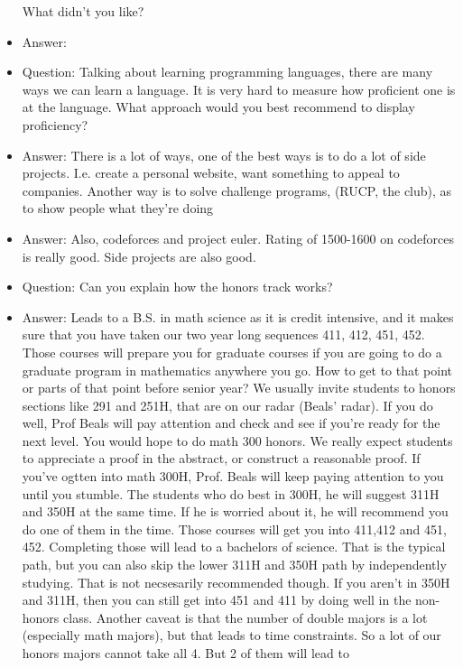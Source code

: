 \documentclass[10pt]{article}
\theoremstyle{definition}
\begin{document}
\begin{itemize}
    What didn't you like?
  \item Answer:
  \item Question: Talking about learning programming languages,
    there are many ways we can learn a language. It is very hard
    to measure how proficient one is at the language. What
    approach would you best recommend to display proficiency?
  \item Answer: There is a lot of ways, one of the best ways is
    to do a lot of side projects. I.e. create a personal website,
    want something to appeal to companies. Another way is to solve
    challenge programs, (RUCP, the club), as to show people what
    they're doing
  \item Answer: Also, codeforces and project euler. Rating of
    1500-1600 on codeforces is really good. Side projects are also
    good.
  \item Question: Can you explain how the honors track works?
  \item Answer: Leads to a B.S. in math science as it is credit
    intensive, and it makes sure that you have taken our two year
    long sequences 411, 412, 451, 452. Those courses will prepare
    you for graduate courses if you are going to do a graduate
    program in mathematics anywhere you go. How to get to that
    point or parts of that point before senior year? We usually
    invite students to honors sections like 291 and 251H, that are
    on our radar (Beals' radar). If you do well, Prof Beals will
    pay attention and check and see if you're ready for the next
    level. You would hope to do math 300 honors. We really expect
    students to appreciate a proof in the abstract, or construct a
    reasonable proof. If you've ogtten into math 300H, Prof. Beals
    will keep paying attention to you until you stumble. The
    students who do best in 300H, he will suggest 311H and 350H at
    the same time. If he is worried about it, he will recommend
    you do one of them in the time. Those courses will get you
    into 411,412 and 451, 452. Completing those will lead to a
    bachelors of science. That is the typical path, but you can
    also skip the lower 311H and 350H path by independently
    studying. That is not necsesarily recommended though. If you
    aren't in 350H and 311H, then you can still get into 451 and
    411 by doing well in the non-honors class. Another caveat is
    that the number of double majors is a lot (especially math
    majors), but that leads to time constraints. So a lot of our
    honors majors cannot take all 4. But 2 of them will lead to

\end{itemize}
\end{document}
